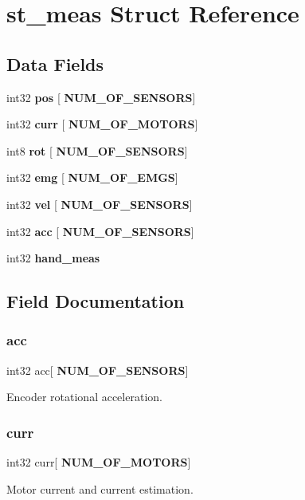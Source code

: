 \section{st\+\_\+meas Struct Reference}
\label{structst__meas}
\subsection*{Data Fields}
\begin{DoxyCompactItemize}
\item 
int32 \textbf{ pos} [\textbf{ N\+U\+M\+\_\+\+O\+F\+\_\+\+S\+E\+N\+S\+O\+RS}]
\item 
int32 \textbf{ curr} [\textbf{ N\+U\+M\+\_\+\+O\+F\+\_\+\+M\+O\+T\+O\+RS}]
\item 
int8 \textbf{ rot} [\textbf{ N\+U\+M\+\_\+\+O\+F\+\_\+\+S\+E\+N\+S\+O\+RS}]
\item 
int32 \textbf{ emg} [\textbf{ N\+U\+M\+\_\+\+O\+F\+\_\+\+E\+M\+GS}]
\item 
int32 \textbf{ vel} [\textbf{ N\+U\+M\+\_\+\+O\+F\+\_\+\+S\+E\+N\+S\+O\+RS}]
\item 
int32 \textbf{ acc} [\textbf{ N\+U\+M\+\_\+\+O\+F\+\_\+\+S\+E\+N\+S\+O\+RS}]
\item 
int32 \textbf{ hand\+\_\+meas}
\end{DoxyCompactItemize}


\subsection{Field Documentation}
\mbox{\label{structst__meas_a382cdae8f034ef5627c27a46e2f00a72}} 
\subsubsection{acc}
{\footnotesize\ttfamily int32 acc[\textbf{ N\+U\+M\+\_\+\+O\+F\+\_\+\+S\+E\+N\+S\+O\+RS}]}

Encoder rotational acceleration. \mbox{\label{structst__meas_a035463484308a2613b907a0cbaa4047c}} 
\subsubsection{curr}
{\footnotesize\ttfamily int32 curr[\textbf{ N\+U\+M\+\_\+\+O\+F\+\_\+\+M\+O\+T\+O\+RS}]}

Motor current and current estimation. \mbox{\label{structst__meas_a3d1b5e40ddbb5e34307f6b8e9cc116ff}} 
